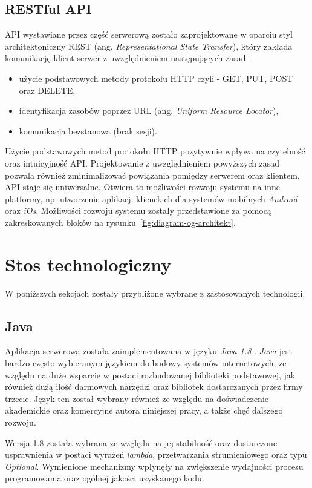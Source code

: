 \subsection{RESTful API}
API wystawiane przez część serwerową zostało zaprojektowane w oparciu styl architektoniczny REST (ang. \textit{Representational State Transfer}), który zakłada komunikację klient-serwer z uwzględnieniem następujących zasad: 
\begin{itemize}
\item użycie podstawowych metody protokołu HTTP czyli - GET, PUT, POST oraz DELETE,
\item identyfikacja zasobów poprzez URL (ang. \textit{Uniform Resource Locator}),
\item komunikacja bezstanowa (brak sesji).
\end{itemize}

Użycie podstawowych metod protokołu HTTP pozytywnie wpływa na czytelność oraz intuicyjność API. Projektowanie z uwzględnieniem powyższych zasad pozwala również zminimalizować powiązania pomiędzy serwerem oraz klientem, API staje się uniwersalne. Otwiera to możliwości rozwoju systemu na inne platformy, np. utworzenie aplikacji klienckich dla systemów mobilnych \textit{Android} oraz \textit{iOs}. Możliwości rozwoju systemu zostały przedstawione za pomocą zakreskowanych bloków na rysunku~\ref{fig:diagram-og-architekt}.

\section{Stos technologiczny}

W poniższych sekcjach zostały przybliżone wybrane z zastosowanych technologii.  

\subsection{Java}

Aplikacja serwerowa została zaimplementowana w języku \textit{Java 1.8} \cite{java}. \textit{Java} jest bardzo często wybieranym językiem do budowy systemów internetowych, ze względu na duże wsparcie w postaci rozbudowanej biblioteki podstawowej, jak również dużą ilość darmowych narzędzi oraz bibliotek dostarczanych przez firmy trzecie. Język ten został wybrany również ze względu na doświadczenie akademickie oraz komercyjne autora niniejszej pracy, a także chęć dalszego rozwoju. 

Wersja 1.8 została wybrana ze względu na jej stabilność oraz dostarczone usprawnienia w postaci wyrażeń \textit{lambda}, przetwarzania strumieniowego oraz typu \textit{Optional}. Wymienione mechanizmy wpłynęły na zwiększenie wydajności procesu programowania oraz ogólnej jakości uzyskanego kodu.
 
